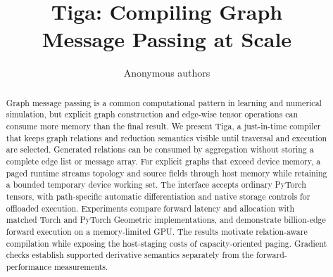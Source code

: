 \documentclass{article}
\title{Tiga: Compiling Graph\\Message Passing at Scale}
\author{Anonymous authors}
\begin{document}
\maketitle
{}
\begin{abstract}
Graph message passing is a common computational pattern in learning and
numerical simulation, but explicit graph construction and edge-wise tensor
operations can consume more memory than the final result. We present Tiga,
a just-in-time compiler that keeps graph relations and reduction semantics
visible until traversal and execution are selected. Generated relations can
be consumed by aggregation without storing a complete edge list or message
array. For explicit graphs that exceed device memory, a paged runtime streams
topology and source fields through host memory while retaining a bounded
temporary device working set. The interface accepts ordinary PyTorch tensors,
with path-specific automatic differentiation and native storage controls for
offloaded execution. Experiments compare forward latency and allocation with
matched Torch and PyTorch Geometric implementations, and demonstrate billion-edge
forward execution on a memory-limited GPU. The results motivate relation-aware
compilation while exposing the host-staging costs of capacity-oriented paging.
Gradient checks establish supported derivative semantics separately from the
forward-performance measurements.
\end{abstract}




\label{ws:main-end}
\clearpage



\clearpage
\appendix

\end{document}
